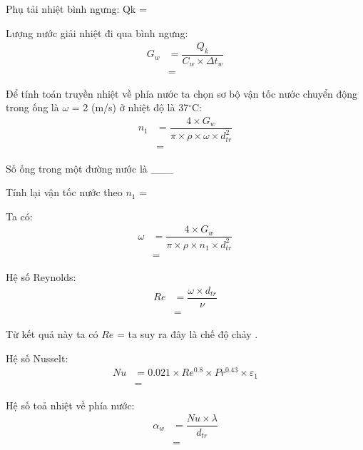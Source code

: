 Phụ tải nhiệt bình ngưng: Q{\scriptsize k} = 

Lượng nước giải nhiệt đi qua bình ngưng:
\begin{equation*}
	\begin{split}
		G_{w} &= \dfrac{Q_{k}}{C_{w}\times \Delta t_{w}}\\
		&=
	\end{split}
\end{equation*}

Để tính toán truyền nhiệt về phía nước ta chọn sơ bộ vận tốc nước chuyển động trong ống là $\omega$ = 2 (m/s) ở nhiệt độ là 37$^{\circ}$C:
\begin{equation*}
	\begin{split}
		n_{1} &= \dfrac{4\times G_{w}}{\pi\times\rho\times\omega\times d_{tr}^2}\\
		&=
	\end{split}
\end{equation*}

Số ống trong một đường nước là \_\_\_

Tính lại vận tốc nước theo $n_{1}$ = 

Ta có:
\begin{equation*}
	\begin{split}
		\omega &= \dfrac{4\times G_{w}}{\pi\times\rho\times n_{1}\times d_{tr}^2}\\
		&=
	\end{split}
\end{equation*}

Hệ số Reynolds:
\begin{equation*}
	\begin{split}
		Re &= \dfrac{\omega\times d_{tr}}{\nu}\\
		&=
	\end{split}
\end{equation*}

Từ kết quả này ta có $ Re $ =  ta suy ra đây là chế độ chảy .

Hệ số Nusselt:
\begin{equation*}
	\begin{split}
		Nu &= 0.021\times Re^{0.8} \times Pr^{0.43} \times\varepsilon_{1}\\
		&=
	\end{split}
\end{equation*}

Hệ số toả nhiệt về phía nước:
\begin{equation*}
	\begin{split}
		\alpha_{w} &= \dfrac{Nu\times \lambda}{d_{tr}}\\
		&=
	\end{split}
\end{equation*}

